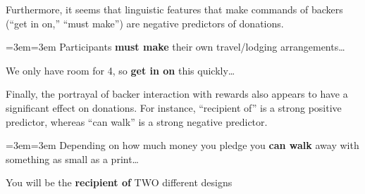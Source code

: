 \documentclass[letterpaper]{article}
\newenvironment{blockquote}{%
  \setlength{\parskip}{.5em}
  \par%
  \small
  \medskip
  \leftskip=3em\rightskip=3em%
  \noindent\ignorespaces}{%
  \par\medskip}
\begin{document}
Furthermore, it seems that linguistic features that make commands of backers (``get in on,'' ``must make'') are negative predictors of donations.
\begin{blockquote}
Participants \textbf{must make} their own travel/lodging arrangements\ldots\par\noindent
We only have room for 4, so \textbf{get in on} this quickly\ldots
\end{blockquote}
Finally, the portrayal of backer interaction with rewards also appears to have a significant effect on donations. For instance, ``recipient of'' is a strong positive predictor, whereas ``can walk'' is a strong negative predictor.
\begin{blockquote}
Depending on how much money you pledge you \textbf{can walk} away with something as small as a print\ldots\par\noindent
You will be the \textbf{recipient of} TWO different designs
\end{blockquote}
\end{document}
